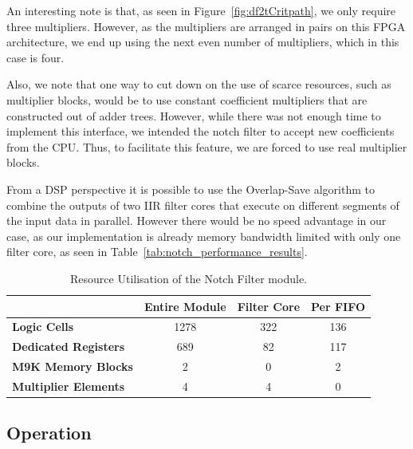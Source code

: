 \documentclass[]{article}
\begin{document}
An interesting note is that, as seen in Figure~\ref{fig:df2tCritpath}, we only require three multipliers. However, as the multipliers are arranged in pairs on this FPGA architecture, we end up using the next even number of multipliers, which in this case is four.

Also, we note that one way to cut down on the use of scarce resources, such as multiplier blocks, would be to use constant coefficient multipliers that are constructed out of adder trees. However, while there was not enough time to implement this interface, we intended the notch filter to accept new coefficients from the CPU.
Thus, to facilitate this feature, we are forced to use real multiplier blocks.

From a DSP perspective it is possible to use the Overlap-Save \cite{overlapsave} algorithm to combine the outputs of two IIR filter cores that execute on different segments of the input data in parallel.
However there would be no speed advantage in our case, as our implementation is already memory bandwidth limited with only one filter core, as seen in Table~\ref{tab:notch_performance_results}.

\begin{table}[tbp]
	\caption{Resource Utilisation of the Notch Filter module.}
	\label{tab:resource_util_notch}
	\begin{center}
		\begin{tabular}{l|ccc}
		\hline

		\hline
											& \textbf{Entire Module} 	& \textbf{Filter Core} 	& \textbf{Per FIFO}\\
		\hline
			\textbf{Logic Cells} 			& 1278 						& 322 					& 136 \\
			\textbf{Dedicated Registers}	& 689						& 82 					& 117 \\
			\textbf{M9K Memory Blocks}		& 2							& 0 					& 2 \\
			\textbf{Multiplier Elements}	& 4							& 4 					& 0 \\
		\hline

		\hline
		\end{tabular}
	\end{center}
\end{table}


\subsection{Operation} %
\label{sub:operation}
\end{document}
